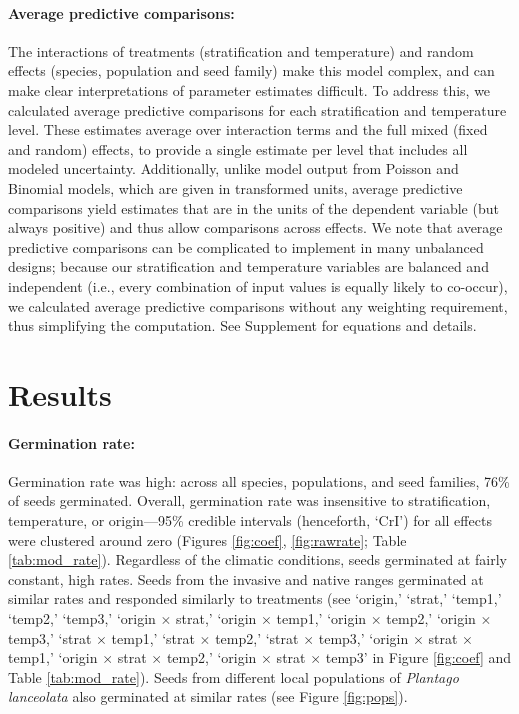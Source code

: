 \documentclass[11pt]{article}\usepackage[]{graphicx}\usepackage[]{color}
\begin{document}
	\paragraph{Average predictive comparisons:} The interactions of treatments (stratification and temperature) and random effects (species, population and seed family) make this model complex, and can make clear interpretations of parameter estimates difficult. To address this, we calculated average predictive comparisons \parencite{Gelman2007} for each stratification and  temperature level. These estimates average over interaction terms and the full mixed (fixed and random) effects, to provide a single estimate per level that includes all modeled uncertainty. Additionally, unlike model output from Poisson and Binomial models, which are given in transformed units, average predictive comparisons yield estimates that are in the units of the dependent variable (but always positive) \parencite{Gelman2007} and thus allow comparisons across effects. We note that average predictive comparisons can be complicated to implement in many unbalanced designs; because our stratification and temperature variables are balanced and independent (i.e., every combination of input values is equally likely to co-occur), we calculated average predictive comparisons without any weighting requirement, thus simplifying the computation. See Supplement for equations and details.

	\section{Results} 
	\paragraph{Germination rate:} Germination rate was high: across all species, populations, and seed families, 76\% of seeds germinated. Overall, germination rate was insensitive to stratification, temperature, or origin---95\% credible intervals (henceforth, `CrI') for all effects were clustered around zero (Figures \ref{fig:coef}, \ref{fig:rawrate}; Table \ref{tab:mod_rate}). Regardless of the climatic conditions, seeds germinated at fairly constant, high rates. Seeds from the invasive and native ranges germinated at similar rates and responded similarly to treatments (see `origin,' `strat,' `temp1,' `temp2,' `temp3,' `origin $\times$ strat,' `origin $\times$ temp1,' `origin $\times$ temp2,' `origin $\times$ temp3,' `strat $\times$ temp1,' `strat $\times$ temp2,' `strat $\times$ temp3,' `origin $\times$ strat $\times$ temp1,' `origin $\times$ strat $\times$ temp2,' `origin $\times$ strat $\times$ temp3' in Figure \ref{fig:coef} and Table \ref{tab:mod_rate}). Seeds from different local populations of \textit{Plantago lanceolata} also germinated at similar rates (see Figure \ref{fig:pops}).
\end{document}
